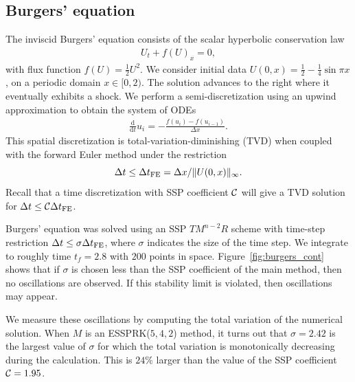 \subsection{Burgers' equation}\label{subsubsec:burgers}
The inviscid Burgers' equation consists of the scalar hyperbolic conservation law
\begin{align}\label{eq:HCL}
    U_{t} + f(U)_{x} = 0,
\end{align}
with flux function $f(U) = \frac{1}{2}U^{2}$. 
We consider initial data
$U(0,x)  = \frac{1}{2} - \frac{1}{4}\sin{\pi x}$,
on a periodic domain $x \in [0,2)$.
The solution advances to the right where it eventually exhibits a shock. 
We perform a semi-discretization
using an upwind approximation to obtain the system of ODEs
\begin{align*}\label{eq:burgers_flux}
	\frac{\textrm{d}}{\textrm{d} t} u_i = -\frac{f(u_{i}) - f(u_{i-1})}{\Delta x}.
\end{align*}
This spatial discretization is total-variation-diminishing (TVD) when
coupled with the forward Euler method under the restriction
\cite{Laney:1998}  %
$$\Delta t \leq {\Delta t}_{\text{FE}} = \Delta x / \|U(0,x)\|_{\infty}.$$
Recall that a time discretization with SSP
coefficient $\mathcal{C}$ will give a TVD solution for $\Delta t \leq
\mathcal{C} {\Delta t}_{\text{FE}}$.

Burgers' equation was solved using an SSP $TM^{n-2}R$ scheme with time-step
restriction $\Delta t \leq \sigma{\Delta t}_{\text{FE}}$, where $\sigma$ indicates the size 
of the time step. 
We integrate to roughly time $t_{f} = 2.8$ with $200$ points in space.
Figure~\ref{fig:burgers_cont} shows that if $\sigma$ is chosen less than the SSP
coefficient of the main method, then no oscillations are observed. 
If this stability limit is violated, then oscillations may appear.

We measure these oscillations by computing the total variation of the 
numerical solution.
When $M$ is an ESSPRK($5,4,2$) method,
it turns out that $\sigma = 2.42$ is the largest value of $\sigma$
for which the total variation is monotonically decreasing during the
calculation.
This is $24\%$ larger than the value of the SSP coefficient $\mathcal{C} = 1.95$.

